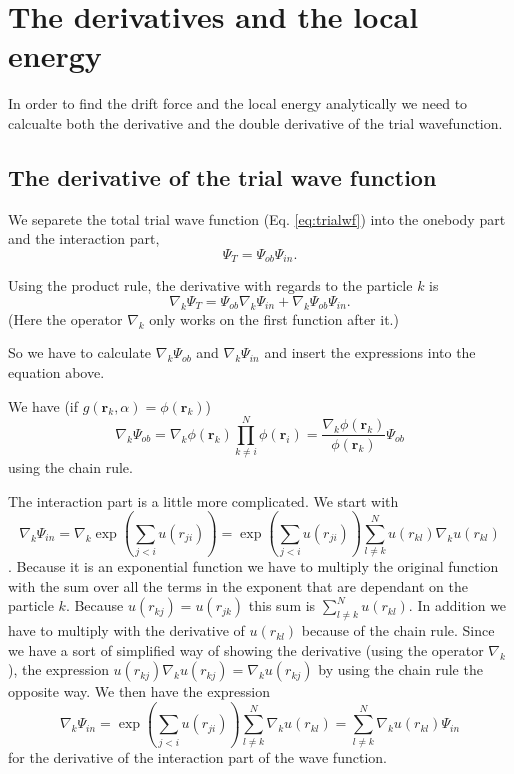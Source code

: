 \section{The derivatives and the local energy}

In order to find the drift force and the local energy analytically we need to calcualte both the derivative and the double derivative of the trial wavefunction.

\subsection{The derivative of the trial wave function}

We separete the total trial wave function (Eq. \ref{eq:trialwf}) into the onebody part and the interaction part,
\begin{equation}
\Psi_T = \Psi_{ob}\Psi_{in}.
\end{equation}

Using the product rule, the derivative with regards to the particle $k$ is
$$ \nabla_k \Psi_T =  \Psi_{ob}\nabla_k\Psi_{in} + \nabla_k\Psi_{ob}\Psi_{in}.$$
(Here the operator $\nabla_k$ only works on the first function after it.)

So we have to calculate $\nabla_k\Psi_{ob}$ and $\nabla_k\Psi_{in}$ and insert the expressions into the equation above.

We have (if $g(\mathbf{r}_k,\alpha) = \phi(\mathbf{r}_k)$)
\begin{equation}\label{eq:psi_ob_derivative}
\nabla_k\Psi_{ob} = \nabla_k \phi(\mathbf{r}_k)\prod_{k\neq i}^N \phi(\mathbf{r}_i)= \frac{\nabla_k \phi(\mathbf{r}_k)}{\phi(\mathbf{r}_k)} \Psi_{ob}
\end{equation}
using the chain rule.

The interaction part is a little more complicated. We start with
$$ \nabla_k\Psi_{in} = \nabla_k  \exp{\left(\sum_{j<i}u(r_{ji})\right)} = \exp{\left(\sum_{j<i}u(r_{ji})\right)} \sum^N_{l \neq k}  u\left(r_{kl}\right) \nabla_k u (r_{kl}) $$. Because it is an exponential function we have to multiply the original function with the sum over all the terms in the exponent that are dependant on the particle $k$. Because $u(r_{kj}) = u(r_{jk})$ this sum is $\sum^N_{l \neq k}  u\left(r_{kl}\right)$. In addition we have to multiply with the derivative of $u(r_{kl})$ because of the chain rule. Since we have a sort of simplified way of showing the derivative (using the operator $\nabla_k$), the expression $u(r_{kj})\nabla_k u(r_{kj}) = \nabla_k u(r_{kj})$ by using the chain rule the opposite way. We then have the expression
$$ \nabla_k\Psi_{in} = \exp{\left(\sum_{j<i}u(r_{ji})\right)} \sum^N_{l \neq k} \nabla_k u (r_{kl}) = \sum^N_{l \neq k} \nabla_k u (r_{kl}) \Psi_{in}$$
for the derivative of the interaction part of the wave function.

